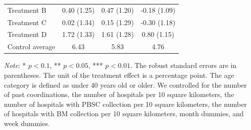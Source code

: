 \documentclass [12pt, a4paper]{article}
\begin{document}
\begin{table}[H]
\begin{threeparttable}
\begin{tabular}[t]{lccc}
\hspace{1em}Treatment B & 0.40 (1.25) & 0.47 (1.20) & -0.18 (1.09)\\
\hspace{1em}Treatment C & 0.02 (1.34) & 0.15 (1.29) & -0.30 (1.18)\\
\hspace{1em}Treatment D & 1.72 (1.33) & 1.61 (1.28) & 0.80 (1.15)\\
\hspace{1em}Control average & 6.43 & 5.83 & 4.76\\
\bottomrule
\end{tabular}
\begin{tablenotes}
\item \emph{Note}: * $p < 0.1$, ** $p < 0.05$, *** $p < 0.01$. The robust standard errors are in parentheses. The unit of the treatment effect is a percentage point. The age category is defined as under 40 years old or older. We controlled for the number of past coordinations, the number of hospitals per 10 square kilometers, the number of hospitals with PBSC collection per 10 square kilometers, the number of hospitals with BM collection per 10 square kilometers, month dummies, and week dummies.
\end{tablenotes}
\end{threeparttable}
\end{table}

\clearpage


\end{document}
